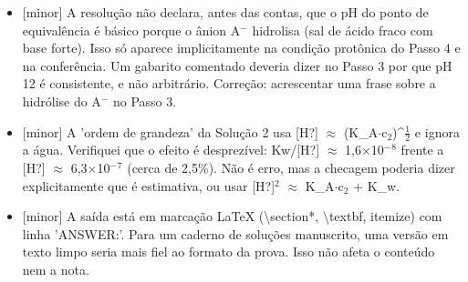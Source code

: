 \documentclass{article}%
\begin{document}
\begin{itemize}%
\item%
{[}minor{]} A resolução não declara, antes das contas, que o pH do ponto de equivalência é básico porque o ânion A$^{-}$ hidrolisa (sal de ácido fraco com base forte). Isso só aparece implicitamente na condição protônica do Passo 4 e na conferência. Um gabarito comentado deveria dizer no Passo 3 por que pH 12 é consistente, e não arbitrário. Correção: acrescentar uma frase sobre a hidrólise do A$^{-}$ no Passo 3.%
\item%
{[}minor{]} A 'ordem de grandeza' da Solução 2 usa {[}H?{]} $\approx$ (K\_A$\cdot$c$_{2}$)\^{}$\frac12$ e ignora a água. Verifiquei que o efeito é desprezível: Kw/{[}H?{]} $\approx$ 1,6$\times$10$^{-}$$^{8}$ frente a {[}H?{]} $\approx$ 6,3$\times$10$^{-}$$^{7}$ (cerca de 2,5\%). Não é erro, mas a checagem poderia dizer explicitamente que é estimativa, ou usar {[}H?{]}$^2$ $\approx$ K\_A$\cdot$c$_{2}$ + K\_w.%
\item%
{[}minor{]} A saída está em marcação LaTeX (\textbackslash{}section*, \textbackslash{}textbf, itemize) com linha 'ANSWER:'. Para um caderno de soluções manuscrito, uma versão em texto limpo seria mais fiel ao formato da prova. Isso não afeta o conteúdo nem a nota.%
\end{itemize}%
\end{document}
